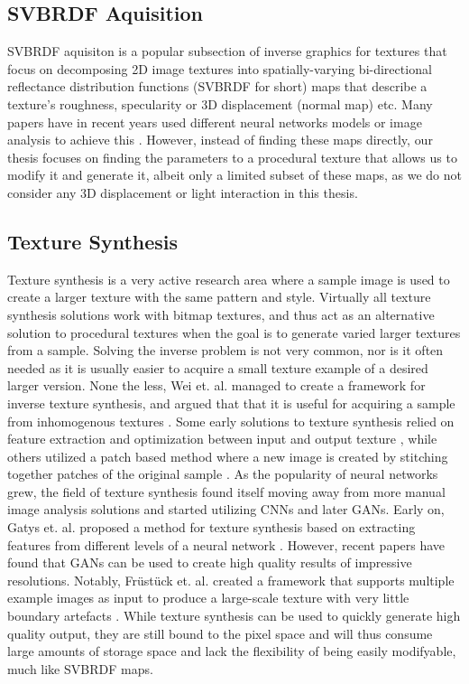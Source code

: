 \subsection{SVBRDF Aquisition}

SVBRDF aquisiton is a popular subsection of inverse graphics for textures that focus on decomposing 2D image textures into spatially-varying bi-directional reflectance distribution functions (SVBRDF for short) maps that describe a texture's roughness, specularity or 3D displacement (normal map) etc. Many papers have in recent years used different neural networks models or image analysis to achieve this \cite{deschaintre_2018_singleimage, kang_2018_efficient, nalbach_2017_deep, aittala_2016_reflectance}. However, instead of finding these maps directly, our thesis focuses on finding the parameters to a procedural texture that allows us to modify it and generate it, albeit only a limited subset of these maps, as we do not consider any 3D displacement or light interaction in this thesis.

\subsection{Texture Synthesis}

Texture synthesis is a very active research area where a sample image is used to create a larger texture with the same pattern and style. Virtually all texture synthesis solutions work with bitmap textures, and thus act as an alternative solution to procedural textures when the goal is to generate varied larger textures from a sample. Solving the inverse problem is not very common, nor is it often needed as it is usually easier to acquire a small texture example of a desired larger version. None the less, Wei et. al. managed to create a framework for inverse texture synthesis, and argued that that it is useful for acquiring a sample from inhomogenous textures \cite{wei_2008_inverse}. Some early solutions to texture synthesis relied on feature extraction and optimization between input and output texture \cite{kwatra_2005_texture}, while others utilized a patch based method where a new image is created by stitching together patches of the original sample \cite{efrosalexeia_2001_image}. As the popularity of neural networks grew, the field of texture synthesis found itself moving away from more manual image analysis solutions and started utilizing CNNs and later GANs. Early on, Gatys et. al. proposed a method for texture synthesis based on extracting features from different levels of a neural network \cite{gatys_2015_texture}. However, recent papers have found that GANs can be used to create high quality results of impressive resolutions. Notably, Früstück et. al. created a framework that supports multiple example images as input to produce a large-scale texture with very little boundary artefacts \cite{frhstck_2019_tilegan}. While texture synthesis can be used to quickly generate high quality output, they are still bound to the pixel space and will thus consume large amounts of storage space and lack the flexibility of being easily modifyable, much like SVBRDF maps.


